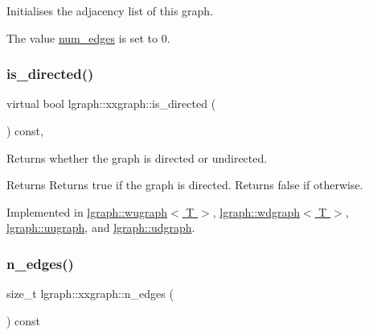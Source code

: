 Initialises the adjacency list of this graph. 

The value \hyperlink{classlgraph_1_1xxgraph_a6765a9a3be42f6e0f824635c593b35d7}{num\+\_\+edges} is set to 0. \mbox{\label{classlgraph_1_1xxgraph_a0a606d77cbbb2efa7056b82c3b8c395c}} 
\subsubsection{\texorpdfstring{is\+\_\+directed()}{is\_directed()}}
{\footnotesize\ttfamily virtual bool lgraph\+::xxgraph\+::is\+\_\+directed (\begin{DoxyParamCaption}{ }\end{DoxyParamCaption}) const\hspace{0.3cm}{\ttfamily [pure virtual]}, {\ttfamily [inherited]}}



Returns whether the graph is directed or undirected. 

\begin{DoxyReturn}{Returns}
Returns true if the graph is directed. Returns false if otherwise. 
\end{DoxyReturn}


Implemented in \hyperlink{classlgraph_1_1wugraph_a1614f4e23aa04055c64816c001cd093d}{lgraph\+::wugraph$<$ T $>$}, \hyperlink{classlgraph_1_1wdgraph_ab167f7c833e7db1a74e65a187f583ed4}{lgraph\+::wdgraph$<$ T $>$}, \hyperlink{classlgraph_1_1uugraph_ab8d27a5e1459960284ac0b334de91ff0}{lgraph\+::uugraph}, and \hyperlink{classlgraph_1_1udgraph_ab346eaf76d049a5148ffd87cda7eab6a}{lgraph\+::udgraph}.

\mbox{\label{classlgraph_1_1xxgraph_af00bce8b07a42754601d1e3bebe2c1fa}} 
\subsubsection{\texorpdfstring{n\+\_\+edges()}{n\_edges()}}
{\footnotesize\ttfamily size\+\_\+t lgraph\+::xxgraph\+::n\+\_\+edges (\begin{DoxyParamCaption}{ }\end{DoxyParamCaption}) const\hspace{0.3cm}{\ttfamily [inherited]}}



